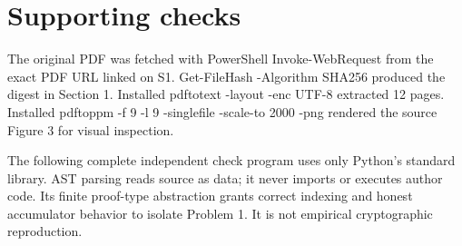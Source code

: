 \documentclass[10pt]{article}
\begin{document}
\section*{Supporting checks}
The original PDF was fetched with PowerShell Invoke-WebRequest from the exact PDF URL linked on S1. Get-FileHash -Algorithm SHA256 produced the digest in Section 1. Installed pdftotext -layout -enc UTF-8 extracted 12 pages. Installed pdftoppm -f 9 -l 9 -singlefile -scale-to 2000 -png rendered the source Figure 3 for visual inspection.\par
The following complete independent check program uses only Python’s standard library. AST parsing reads source as data; it never imports or executes author code. Its finite proof-type abstraction grants correct indexing and honest accumulator behavior to isolate Problem 1. It is not empirical cryptographic reproduction.\par
\end{document}
